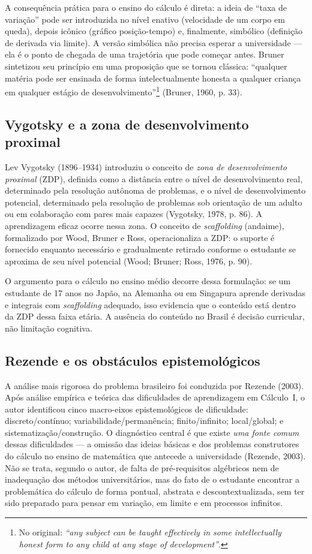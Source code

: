 \documentclass[12pt,a4paper,oneside]{article}
\begin{document}
A consequência prática para o ensino do cálculo é direta: a ideia de
``taxa de variação'' pode ser introduzida no nível enativo (velocidade de
um corpo em queda), depois icônico (gráfico posição-tempo) e, finalmente,
simbólico (definição de derivada via limite). A versão simbólica não
precisa esperar a universidade --- ela é o ponto de chegada de uma
trajetória que pode começar antes. Bruner sintetizou seu princípio em
uma proposição que se tornou clássica: ``qualquer matéria pode ser
ensinada de forma intelectualmente honesta a qualquer criança em qualquer
estágio de desenvolvimento''\footnote{No original: \emph{``any subject
can be taught effectively in some intellectually honest form to any child
at any stage of development''}.} (Bruner, 1960, p. 33).

\subsection{Vygotsky e a zona de desenvolvimento proximal}

Lev Vygotsky (1896--1934) introduziu o conceito de \emph{zona de
desenvolvimento proximal} (ZDP), definida como a distância entre o nível
de desenvolvimento real, determinado pela resolução autônoma de
problemas, e o nível de desenvolvimento potencial, determinado pela
resolução de problemas sob orientação de um adulto ou em colaboração com
pares mais capazes (Vygotsky, 1978, p. 86). A aprendizagem eficaz ocorre
nessa zona. O conceito de \emph{scaffolding} (andaime), formalizado por
Wood, Bruner e Ross, operacionaliza a ZDP: o suporte é fornecido enquanto
necessário e gradualmente retirado conforme o estudante se aproxima de
seu nível potencial (Wood; Bruner; Ross, 1976, p. 90).

O argumento para o cálculo no ensino médio decorre dessa formulação: se
um estudante de 17 anos no Japão, na Alemanha ou em Singapura aprende
derivadas e integrais com \emph{scaffolding} adequado, isso evidencia que
o conteúdo está dentro da ZDP dessa faixa etária. A ausência do conteúdo
no Brasil é decisão curricular, não limitação cognitiva.

\subsection{Rezende e os obstáculos epistemológicos}

A análise mais rigorosa do problema brasileiro foi conduzida por Rezende
(2003). Após análise empírica e teórica das dificuldades de aprendizagem
em Cálculo~I, o autor identificou cinco macro-eixos epistemológicos de
dificuldade: discreto/contínuo; variabilidade/permanência;
finito/infinito; local/global; e sistematização/construção. O diagnóstico
central é que existe \emph{uma fonte comum} dessas dificuldades --- a
omissão das ideias básicas e dos problemas construtores do cálculo no
ensino de matemática que antecede a universidade (Rezende, 2003). Não se
trata, segundo o autor, de falta de pré-requisitos algébricos nem de
inadequação dos métodos universitários, mas do fato de o estudante
encontrar a problemática do cálculo de forma pontual, abstrata e
descontextualizada, sem ter sido preparado para pensar em variação, em
limite e em processos infinitos.
\end{document}
